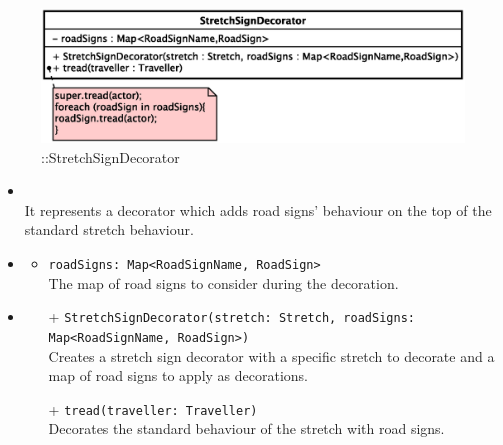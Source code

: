 \begin{figure}[h]
\centering
\includegraphics[scale=0.6,keepaspectratio]{images/solution/app/backend/stretch_sign_decorator.eps}
\caption{\pReactiveComponentStretchDecoration::StretchSignDecorator}
\label{fig:sd-app-stretch_sign_decorator}
\end{figure}
\FloatBarrier
\begin{itemize}
  \item \textbf{\descr} \\
    It represents a decorator which adds road signs' behaviour on the top of the
    standard stretch behaviour. 
  \item \textbf{\attrs}
  \begin{itemize}
    \item \texttt{roadSigns: Map<RoadSignName, RoadSign>} \\
The map of road signs to consider during the decoration.
  \end{itemize}
  \item \textbf{\ops}
   \begin{itemize} 
   \item[+] \texttt{StretchSignDecorator(stretch: Stretch, roadSigns: Map<RoadSignName, RoadSign>)} \\
Creates a stretch sign decorator with a specific stretch to decorate and a map of road signs to apply as decorations.
    \item[+] \texttt{tread(traveller: Traveller)} \\
Decorates the standard behaviour of the stretch with road signs.  
  \end{itemize}
\end{itemize}
